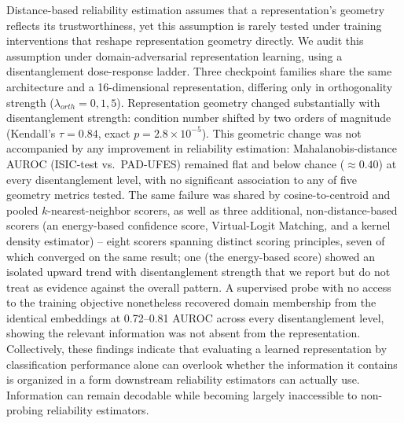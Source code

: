 %

Distance-based reliability estimation assumes that a representation's
geometry reflects its trustworthiness, yet this assumption is rarely tested
under training interventions that reshape representation geometry directly.
We audit this assumption under domain-adversarial representation learning, using a disentanglement dose-response ladder. Three
checkpoint families share the same architecture and a 16-dimensional
representation, differing only in orthogonality strength
($\lambda_{orth} = 0, 1, 5$). Representation geometry changed
substantially with disentanglement strength: condition number shifted by
two orders of magnitude (Kendall's $\tau=0.84$, exact $p=2.8\times10^{-5}$).
This geometric change was not accompanied by any improvement in reliability
estimation: Mahalanobis-distance AUROC (ISIC-test vs.\ PAD-UFES) remained
flat and below chance ($\approx 0.40$) at every disentanglement level, with
no significant association to any of five geometry metrics tested. The same
failure was shared by cosine-to-centroid and pooled $k$-nearest-neighbor
scorers, as well as three additional, non-distance-based scorers (an
energy-based confidence score, Virtual-Logit Matching, and a kernel density
estimator) -- eight scorers spanning distinct scoring principles, seven of
which converged on the same result; one (the energy-based score) showed an
isolated upward trend with disentanglement strength that we report but do
not treat as evidence against the overall pattern. A supervised probe with no access to the
training objective nonetheless recovered domain membership from the
identical embeddings at 0.72--0.81 AUROC across every disentanglement level,
showing the relevant information was not absent from the representation.
Collectively, these findings indicate that evaluating a learned representation by
classification performance alone can overlook whether the information it
contains is organized in a form downstream reliability estimators can
actually use. Information can remain decodable while becoming largely inaccessible
to non-probing reliability estimators.
